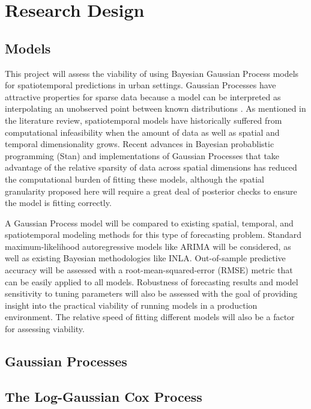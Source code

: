
\section{Research Design}
\label{design}


\subsection{Models}

This project will assess the viability of using Bayesian Gaussian Process models for spatiotemporal predictions in urban settings. Gaussian Processes have attractive properties for sparse data because a model can be interpreted as interpolating an unobserved point between known distributions . As mentioned in the literature review, spatiotemporal models have historically suffered from computational infeasibility when the amount of data as well as spatial and temporal dimensionality grows. Recent advances in Bayesian probablistic programming (Stan) and implementations of Gaussian Processes that take advantage of the relative sparsity of data across spatial dimensions has reduced the computational burden of fitting these models, although the spatial granularity proposed here will require a great deal of posterior checks to ensure the model is fitting correctly. \par

A Gaussian Process model will be compared to  existing spatial, temporal, and spatiotemporal modeling methods for this type of forecasting problem. Standard maximum-likelihood autoregressive models like ARIMA will be considered, as well as existing Bayesian methodologies like INLA. Out-of-sample predictive accuracy will be assessed with a root-mean-squared-error (RMSE) metric that
can be easily applied to all models. Robustness of forecasting results and model sensitivity to tuning parameters will also be assessed with the goal of providing insight into the practical viability of running models in a production environment. The relative speed of fitting different models will also be a factor for assessing viability. \par

\subsection{Gaussian Processes}

\subsection{The Log-Gaussian Cox Process}

